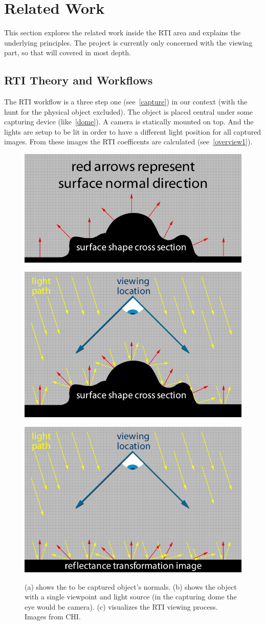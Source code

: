 \section{Related Work}
This section explores the related work inside the RTI area and explains the
underlying principles. The project is currently only concerned with the viewing
part, so that will covered in most depth.

\subsection{RTI Theory and Workflows}

The RTI workflow is a three step one (see~\autoref{capture}) in our context
(with the hunt for the physical object excluded). The object is placed central under
some capturing device (like~\autoref{dome}). A camera is
statically mounted on top. And the lights are setup to be lit in
order to have a different light position for all captured images. From these
images the RTI coefficents are calculated (see~\autoref{overview1}).


\begin{figure}
\begin{subfloat}[]{\includegraphics[max width=0.32\linewidth]{images/normals_01}}\end{subfloat}
\begin{subfloat}[]{\includegraphics[max width=0.32\linewidth]{images/normals_02}}\end{subfloat}
\begin{subfloat}[]{\includegraphics[max width=0.32\linewidth]{images/normals_03}}\end{subfloat}
\caption[RTI Overview]{(a) shows the to be captured object's normals.
  (b) shows the object with a single viewpoint and light source (in the
  capturing dome the eye would be camera). (c) visualizes the RTI viewing
  process. Images from CHI\cite*{noauthor_cultural_nodate}.}
\label{overview1}
\end{figure}

